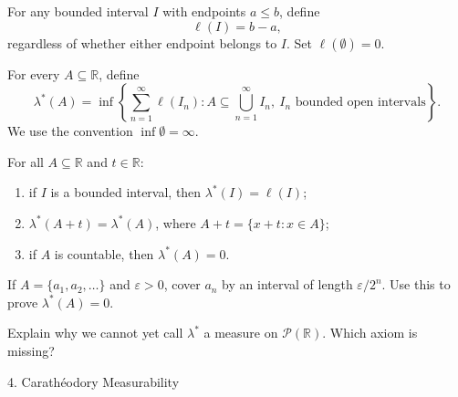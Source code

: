 \documentclass[12pt,a4paper]{article}
\begin{document}
\clearpage

\begin{definition}
    For any bounded interval $I$ with endpoints $a\leq b$, define
    \[
        \ell(I)=b-a,
    \]
    regardless of whether either endpoint belongs to $I$. Set $\ell(\emptyset)=0$.
\end{definition}

\vspace{30pt}

\begin{definition}
    For every $A\subseteq\mathbb{R}$, define
    \[
        \lambda^*(A)=
        \inf\left\{
        \sum_{n=1}^{\infty}\ell(I_n):
        A\subseteq\bigcup_{n=1}^{\infty}I_n,
        \ I_n\text{ bounded open intervals}
        \right\}.
    \]
    We use the convention $\inf\emptyset=\infty$.
\end{definition}


\clearpage

\begin{theorem}
    For all $A\subseteq\mathbb{R}$ and $t\in\mathbb{R}$:
    \begin{enumerate}
        \item if $I$ is a bounded interval, then $\lambda^*(I)=\ell(I)$;
        \item $\lambda^*(A+t)=\lambda^*(A)$, where
        $A+t=\{x+t:x\in A\}$;
        \item if $A$ is countable, then $\lambda^*(A)=0$.
    \end{enumerate}
\end{theorem}

\clearpage

\begin{problem}
    If $A=\{a_1,a_2,\ldots\}$ and $\varepsilon>0$, cover $a_n$ by an interval of length $\varepsilon/2^n$. Use this to prove $\lambda^*(A)=0$.
\end{problem}

\clearpage

\begin{problem}
    Explain why we cannot yet call $\lambda^*$ a measure on $\mathcal{P}(\mathbb{R})$. Which axiom is missing?
\end{problem}

\clearpage

\begin{heading}
    4. Carath\'eodory Measurability
\end{heading}
\end{document}
